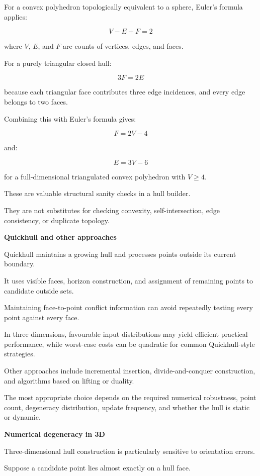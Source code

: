 For a convex polyhedron topologically equivalent to a sphere, Euler's formula applies:

\[
\boxed{V-E+F=2}
\]

where \(V\), \(E\), and \(F\) are counts of vertices, edges, and faces.

For a purely triangular closed hull:

\[
3F=2E
\]

because each triangular face contributes three edge incidences, and every edge belongs to two faces.

Combining this with Euler's formula gives:

\[
\boxed{F=2V-4}
\]

and:

\[
\boxed{E=3V-6}
\]

for a full-dimensional triangulated convex polyhedron with \(V\ge4\).

These are valuable structural sanity checks in a hull builder.

They are not substitutes for checking convexity, self-intersection, edge consistency, or duplicate topology.

\textbf{Quickhull and other approaches}

Quickhull maintains a growing hull and processes points outside its current boundary.

It uses visible faces, horizon construction, and assignment of remaining points to candidate outside sets.

Maintaining face-to-point conflict information can avoid repeatedly testing every point against every face.

In three dimensions, favourable input distributions may yield efficient practical performance, while worst-case costs can be quadratic for common Quickhull-style strategies.

Other approaches include incremental insertion, divide-and-conquer construction, and algorithms based on lifting or duality.

The most appropriate choice depends on the required numerical robustness, point count, degeneracy distribution, update frequency, and whether the hull is static or dynamic.

\textbf{Numerical degeneracy in 3D}

Three-dimensional hull construction is particularly sensitive to orientation errors.

Suppose a candidate point lies almost exactly on a hull face.

